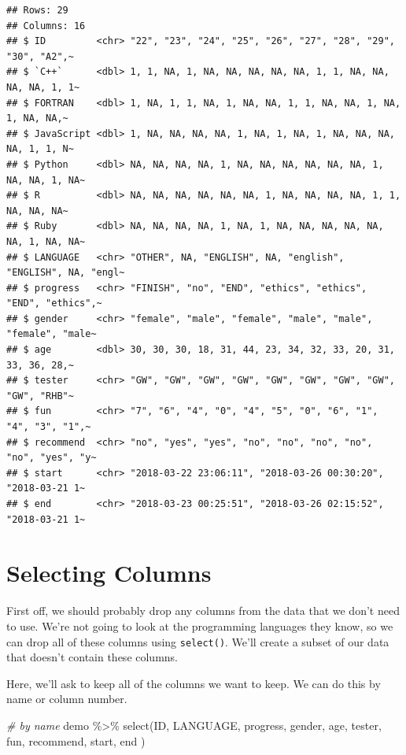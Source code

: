 \documentclass[
]{book}
\newenvironment{Shaded}{\begin{snugshade}}{\end{snugshade}}
\newcommand{\CommentTok}[1]{\textcolor[rgb]{0.56,0.35,0.01}{\textit{#1}}}
\newcommand{\FunctionTok}[1]{\textcolor[rgb]{0.00,0.00,0.00}{#1}}
\newcommand{\NormalTok}[1]{#1}
\newcommand{\SpecialCharTok}[1]{\textcolor[rgb]{0.00,0.00,0.00}{#1}}
\begin{document}
\begin{verbatim}
## Rows: 29
## Columns: 16
## $ ID         <chr> "22", "23", "24", "25", "26", "27", "28", "29", "30", "A2",~
## $ `C++`      <dbl> 1, 1, NA, 1, NA, NA, NA, NA, NA, 1, 1, NA, NA, NA, NA, 1, 1~
## $ FORTRAN    <dbl> 1, NA, 1, 1, NA, 1, NA, NA, 1, 1, NA, NA, 1, NA, 1, NA, NA,~
## $ JavaScript <dbl> 1, NA, NA, NA, NA, 1, NA, 1, NA, 1, NA, NA, NA, NA, 1, 1, N~
## $ Python     <dbl> NA, NA, NA, NA, 1, NA, NA, NA, NA, NA, NA, 1, NA, NA, 1, NA~
## $ R          <dbl> NA, NA, NA, NA, NA, NA, 1, NA, NA, NA, NA, 1, 1, NA, NA, NA~
## $ Ruby       <dbl> NA, NA, NA, NA, 1, NA, 1, NA, NA, NA, NA, NA, NA, 1, NA, NA~
## $ LANGUAGE   <chr> "OTHER", NA, "ENGLISH", NA, "english", "ENGLISH", NA, "engl~
## $ progress   <chr> "FINISH", "no", "END", "ethics", "ethics", "END", "ethics",~
## $ gender     <chr> "female", "male", "female", "male", "male", "female", "male~
## $ age        <dbl> 30, 30, 30, 18, 31, 44, 23, 34, 32, 33, 20, 31, 33, 36, 28,~
## $ tester     <chr> "GW", "GW", "GW", "GW", "GW", "GW", "GW", "GW", "GW", "RHB"~
## $ fun        <chr> "7", "6", "4", "0", "4", "5", "0", "6", "1", "4", "3", "1",~
## $ recommend  <chr> "no", "yes", "yes", "no", "no", "no", "no", "no", "yes", "y~
## $ start      <chr> "2018-03-22 23:06:11", "2018-03-26 00:30:20", "2018-03-21 1~
## $ end        <chr> "2018-03-23 00:25:51", "2018-03-26 02:15:52", "2018-03-21 1~
\end{verbatim}

\hypertarget{selecting-columns}{%
\section{Selecting Columns}\label{selecting-columns}}

First off, we should probably drop any columns from the data that we don't need to use. We're not going to look at the programming languages they know, so we can drop all of these columns using \texttt{select()}. We'll create a subset of our data that doesn't contain these columns.

Here, we'll ask to keep all of the columns we want to keep. We can do this by name or column number.

\begin{Shaded}
\begin{Highlighting}[]
\CommentTok{\# by name}
\NormalTok{demo }\SpecialCharTok{\%\textgreater{}\%} \FunctionTok{select}\NormalTok{(ID, }
\NormalTok{                LANGUAGE, }
\NormalTok{                progress, }
\NormalTok{                gender, }
\NormalTok{                age, }
\NormalTok{                tester, }
\NormalTok{                fun,}
\NormalTok{                recommend,}
\NormalTok{                start,}
\NormalTok{                end}
\NormalTok{                )}
\end{Highlighting}
\end{Shaded}
\end{document}

